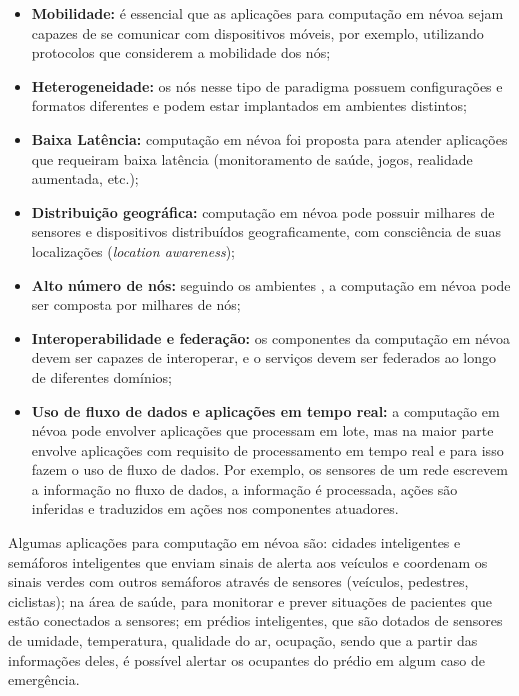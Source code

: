 \begin{itemize}

    \item \textbf{Mobilidade:} é essencial que as aplicações para computação em névoa sejam
    capazes de se comunicar com dispositivos móveis, por exemplo, utilizando
    protocolos que considerem a mobilidade dos nós;

    \item \textbf{Heterogeneidade:} os nós nesse tipo de paradigma possuem
    configurações e formatos diferentes e podem estar implantados em ambientes
    distintos;

    \item \textbf{Baixa Latência:} computação em névoa foi proposta para
    atender aplicações que requeiram baixa latência (monitoramento de saúde,
    jogos, realidade aumentada, etc.);

    \item \textbf{Distribuição geográfica:} computação em névoa pode possuir
    milhares de sensores e dispositivos distribuídos geograficamente, com
    consciência de suas localizações (\emph{location awareness});

    \item \textbf{Alto número de nós:} seguindo os ambientes \iot, a computação
    em névoa pode ser composta por milhares de nós;

    \item \textbf{Interoperabilidade e federação:} os componentes da computação
    em névoa devem ser capazes de interoperar, e o serviços devem ser federados
    ao longo de diferentes domínios;

    \item \textbf{Uso de fluxo de dados e aplicações em tempo real:} a
    computação em névoa pode envolver aplicações que processam em lote, mas na
    maior parte envolve aplicações com requisito de processamento em
    tempo real e para isso fazem o uso de fluxo de dados. Por exemplo, os
    sensores de um rede \iot escrevem a informação no fluxo de dados, a
    informação é processada, ações são inferidas e traduzidos em
    ações nos componentes atuadores.

\end{itemize}

Algumas aplicações para computação em névoa são:
cidades inteligentes e
semáforos inteligentes que enviam sinais de alerta aos veículos e coordenam os
sinais verdes com outros semáforos através de sensores (veículos, pedestres,
ciclistas);
na área de saúde, para monitorar e prever situações de pacientes que
estão conectados a sensores;
em prédios inteligentes, que são dotados de sensores
de umidade, temperatura, qualidade do ar, ocupação, sendo que a partir das
informações deles, é possível alertar os ocupantes do prédio em algum caso de
emergência.

